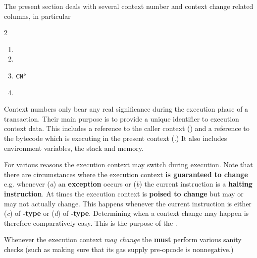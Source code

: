 The present section deals with several context number and context change related columns, in particular
\begin{multicols}{2}
	\begin{enumerate}
		\item \cmc
		\item \cn
		\item $\texttt{CN}^{\nu}$
		\item \caller
	\end{enumerate}
\end{multicols}
Context numbers only bear any real significance during the execution phase of a transaction.
Their main purpose is to provide a unique identifier to execution context data.
This includes a reference to the caller context (\caller) and a reference to the bytecode which is executing in the present context (\cfi.)
It also includes environment variables, the stack and memory.

For various reasons the execution context may switch during execution.
Note that there are circumstances where the execution context \textbf{is guaranteed to change} e.g. whenever
(\emph{a}) an \textbf{exception} occurs or
(\emph{b}) the current instruction is a \textbf{halting instruction}.
At times the execution context is \textbf{poised to change} but may or may not actually change.
This happens whenever the current instruction is either
(\emph{c}) of \textbf{-type} or
(\emph{d}) of \textbf{-type}.
Determining when a context change may happen is therefore comparatively easy.
This is the purpose of the \cmc{}.

\saNote{} Whenever the execution context \emph{may change} the \zkEvm{} \textbf{must} perform various sanity checks (such as making sure that its gas supply pre-opcode is nonnegative.)

